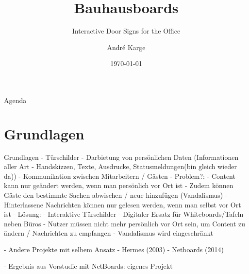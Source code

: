 \documentclass[11pt]{beamer}
\title[Bauhausboards]{Bauhausboards}
\subtitle{Interactive Door Signs for the Office}
\author[André Karge]{André Karge}
\institute[Bauhaus-Universität Weimar]{}
\date[\today]{\today}
\begin{document}

\maketitle

\begin{frame}{Agenda}
\tableofcontents
\end{frame}

\section{Grundlagen}
\begin{frame}{Grundlagen}
  - Türschilder
    - Darbietung von persönlichen Daten (Informationen aller Art - Handskizzen, Texte, Ausdrucke, Statusmeldungen(bin gleich wieder da))
    - Kommunikation zwischen Mitarbeitern / Gästen
  - Problem?:
    - Content kann nur geändert werden, wenn man persönlich vor Ort ist
    - Zudem können Gäste den bestimmte Sachen abwischen / neue hinzufügen (Vandalismus)
    - Hinterlassene Nachrichten können nur gelesen werden, wenn man selbst vor Ort ist
  - Lösung:
    - Interaktive Türschilder
    - Digitaler Ersatz für Whiteboards/Tafeln neben Büros
    - Nutzer müssen nicht mehr persönlich vor Ort sein, um Content zu ändern / Nachrichten zu empfangen
    - Vandalismus wird eingeschränkt

  - Andere Projekte mit selbem Ansatz
    - Hermes (2003)
    - Netboards (2014)

  - Ergebnis aus Vorstudie mit NetBoards: eigenes Projekt

\end{frame}
\end{document}
